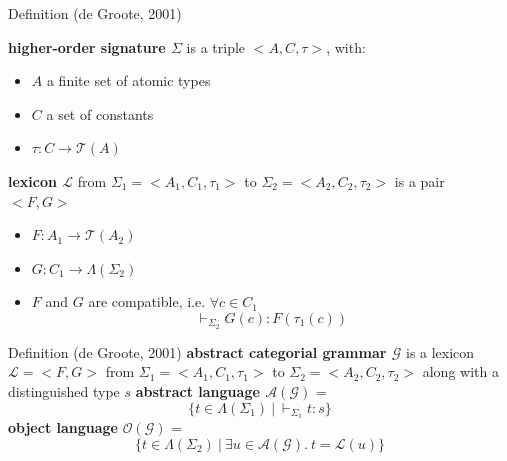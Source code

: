\documentclass{beamer}
\begin{document}
\begin{frame}{Definition (de Groote, 2001)}
 
\textbf{higher-order signature $\Sigma$} is a triple $\mathopen{<}A, C,
\tau\mathclose{>}$, with:
\begin{itemize}
  \item $A$ a finite set of atomic types
  \item $C$ a set of constants
  \item $\tau : C \to \mathcal{T}(A)$
\end{itemize}

\vfill
\pause

\textbf{lexicon $\mathcal{L}$} from $\Sigma_1 = \mathopen{<}A_1, C_1,
\tau_1\mathclose{>}$ to $\Sigma_2 = \mathopen{<}A_2, C_2,
\tau_2\mathclose{>}$ is a pair $\mathopen{<}F, G\mathclose{>}$

\begin{itemize}
  \item $F : A_1 \to \mathcal{T}(A_2)$
  \item $G : C_1 \to \Lambda(\Sigma_2)$
  \item $F$ and $G$ are compatible, i.e. $\forall c \in C_1$
    $$
      \vdash_{\Sigma_2} G(c) : F(\tau_1(c))
    $$
\end{itemize}
 
\end{frame}


\begin{frame}{Definition (de Groote, 2001)}
  \textbf{abstract categorial grammar $\mathcal{G}$} is a lexicon
  $\mathcal{L} = \mathopen{<}F, G\mathclose{>}$ from $\Sigma_1 =
  \mathopen{<}A_1, C_1, \tau_1\mathclose{>}$ to $\Sigma_2 =
  \mathopen{<}A_2, C_2, \tau_2\mathclose{>}$ along with a distinguished
  type $s$
  \vfill
  \textbf{abstract language $\mathcal{A(G)}$} =
  $$
  \{ t \in \Lambda(\Sigma_1)\ |\ \vdash_{\Sigma_1} t : s \}
  $$
  \vfill
  \textbf{object language} $\mathcal{O(G)}$ = 
  $$
  \{ t \in \Lambda(\Sigma_2)\ |\ \exists u \in \mathcal{A(G)}.\ t = \mathcal{L}(u) \}
  $$
\end{frame}
\end{document}
